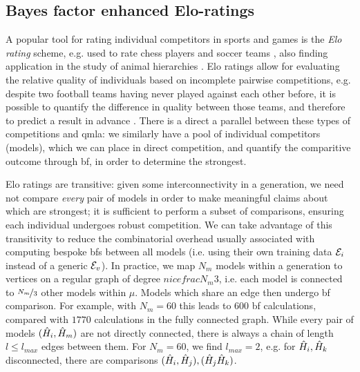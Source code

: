 \subsection{Bayes factor enhanced Elo-ratings}\label{sec:elo}
A popular tool for rating individual competitors in sports and games is the \emph{Elo rating} scheme, 
    e.g. used to rate chess players and soccer teams \cite{elo1978rating, fifa_elo}, 
    also finding application in the study of animal hierarchies \cite{neumann2011assessing}. 
Elo ratings allow for evaluating the relative quality of individuals 
    based on incomplete pairwise competitions, 
    e.g. despite two football teams having never played against each other before, 
    it is possible to quantify the difference in quality between those teams, 
    and therefore to predict a result in advance \cite{hvattum2010using}. 
There is a direct a parallel between these types of competitions and \gls{qmla}:
    we similarly have a pool of individual competitors (models), 
    which we can place in direct competition, 
    and quantify the comparitive outcome through \gls{bf}, 
    in order to determine the strongest. 

\par 
Elo ratings are transitive: given some interconnectivity in a generation, 
    we need not compare \emph{every} pair of models in order to 
    make meaningful claims about which are strongest;
    it is sufficient to perform a subset of comparisons, 
    ensuring each individual undergoes robust competition.
We can take advantage of this transitivity to reduce the combinatorial overhead 
    usually associated with computing bespoke \glspl{bf} between all models 
    (i.e. using their own training data ${ \mathcal{E} }_i$ instead of a generic 
    ${ \mathcal{E} }_v$).
In practice, we map $N_m$ models within a generation to vertices on a regular graph
    of degree $nicefrac{N_m}{3}$, i.e. each model is connected to $\nicefrac{N_m}{3}$ 
    other models within $\mu$. 
Models which share an edge then undergo \gls{bf} comparison. 
For example, with $N_m=60$ this leads to $600$ \gls{bf} calculations, 
    compared with $1770$ calculations in the fully connected graph. 
While every pair of models $(\hat{H}_i, \hat{H}_{m})$ are not directly connected, 
    there is always a chain of length $l \leq l_{max}$ edges between them.
For $N_m=60$, we find $l_{max}=2$, 
    e.g. for $\hat{H}_i, \hat{H}_k$ disconnected, there are comparisons $(\hat{H}_i, \hat{H}_j), (\hat{H}_j \hat{H}_k)$. 
    
\par 

